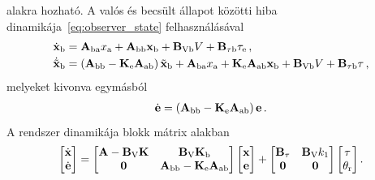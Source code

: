 alakra hozható. A valós és becsült állapot közötti hiba dinamikája~\eqref{eq:observer_state} felhasználásával
\begin{equation}
    \begin{split}
    \dot{\mathbf{x}}_{\mathrm{b}} &= \mathbf{A}_{\mathrm{ba}} x_{\mathrm{a}} + \mathbf{A}_{\mathrm{bb}} \mathbf{x}_{\mathrm{b}} + 
    \mathbf{B}_{\mathrm{Vb}} V + \mathbf{B}_{\mathrm{\tau b}} \tau_{\mathrm{e}}\,,\\
    \dot{\tilde{\mathbf{x}}}_{\mathrm{b}} &= \left(\mathbf{A}_{\mathrm{bb}} - \mathbf{K}_{\mathrm{e}} \mathbf{A}_{\mathrm{ab}}\right) \tilde{\mathbf{x}}_{\mathrm{b}} +
    \mathbf{A}_{\mathrm{ba}} x_{\mathrm{a}} +
    \mathbf{K}_{\mathrm{e}} \mathbf{A}_{\mathrm{ab}} \mathbf{x}_{\mathrm{b}} +
    \mathbf{B}_{\mathrm{Vb}} V + \mathbf{B}_{\mathrm{\tau b}} \tau\,,
    \end{split}
\end{equation}
melyeket kivonva egymásból
\begin{align}
    \dot{\mathbf{e}} = \left(\mathbf{A}_{\mathrm{bb}} - \mathbf{K}_{\mathrm{e}} \mathbf{A}_{\mathrm{ab}}\right) \mathbf{e}\,.
\end{align}
A rendszer dinamikája blokk mátrix alakban
\begin{align}
    \begin{bmatrix}
        \dot{\mathbf{x}} \\
        \dot{\mathbf{e}}
    \end{bmatrix}
    =
    \begin{bmatrix}
        \mathbf{A} - \mathbf{B}_{\mathrm{V}} \mathbf{K} & \mathbf{B}_{\mathrm{V}} \mathbf{K}_{\mathrm{b}} \\
        \mathbf{0} & \mathbf{A}_{\mathrm{bb}} - \mathbf{K}_{\mathrm{e}} \mathbf{A}_{\mathrm{ab}}
    \end{bmatrix}
    \begin{bmatrix}
        \mathbf{x} \\
        \mathbf{e}
    \end{bmatrix}
    +
    \begin{bmatrix}
        \mathbf{B}_{\mathrm{\tau}} & \mathbf{B}_{\mathrm{V}} k_1\\
        \mathbf{0} & \mathbf{0}
    \end{bmatrix}
    \begin{bmatrix}
        \tau \\
        \theta_{\mathrm{r}}
    \end{bmatrix}.
\end{align}

